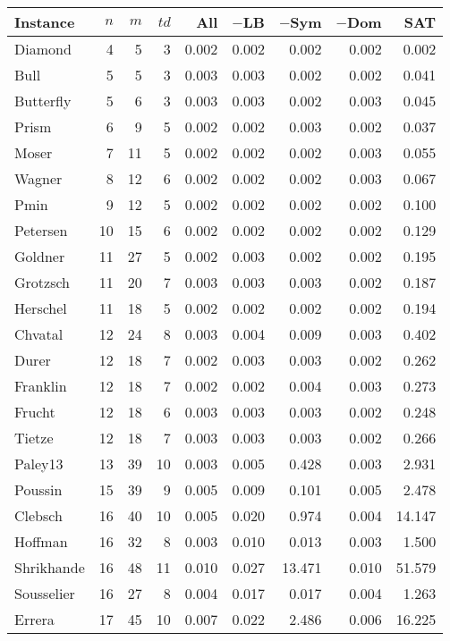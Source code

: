 \begin{table}[htb]
\centering
 \begin{tabular}{l r r r r r r r r} 
 \toprule
 Instance & $n$ & $m$ & $\mathit{td}$ & All & $-$LB & $-$Sym & $-$Dom & SAT \\ [0.5ex] 
 \midrule
Diamond & 4 & 5 & 3 & 0.002 & 0.002 & 0.002 & 0.002 & 0.002 \\
Bull & 5 & 5 & 3 & 0.003 & 0.003 & 0.002 & 0.002 & 0.041 \\
Butterfly & 5 & 6 & 3 & 0.003 & 0.003 & 0.002 & 0.003 & 0.045 \\
Prism & 6 & 9 & 5 & 0.002 & 0.002 & 0.003 & 0.002 & 0.037 \\
Moser & 7 & 11 & 5 & 0.002 & 0.002 & 0.002 & 0.003 & 0.055 \\
Wagner & 8 & 12 & 6 & 0.002 & 0.002 & 0.002 & 0.003 & 0.067 \\
Pmin & 9 & 12 & 5 & 0.002 & 0.002 & 0.002 & 0.002 & 0.100 \\
Petersen & 10 & 15 & 6 & 0.002 & 0.002 & 0.002 & 0.002 & 0.129 \\
Goldner & 11 & 27 & 5 & 0.002 & 0.003 & 0.002 & 0.002 & 0.195 \\
Grotzsch & 11 & 20 & 7 & 0.003 & 0.003 & 0.003 & 0.002 & 0.187 \\
Herschel & 11 & 18 & 5 & 0.002 & 0.002 & 0.002 & 0.002 & 0.194 \\
Chvatal & 12 & 24 & 8 & 0.003 & 0.004 & 0.009 & 0.003 & 0.402 \\
Durer & 12 & 18 & 7 & 0.002 & 0.003 & 0.003 & 0.002 & 0.262 \\
Franklin & 12 & 18 & 7 & 0.002 & 0.002 & 0.004 & 0.003 & 0.273 \\
Frucht & 12 & 18 & 6 & 0.003 & 0.003 & 0.003 & 0.002 & 0.248 \\
Tietze & 12 & 18 & 7 & 0.003 & 0.003 & 0.003 & 0.002 & 0.266 \\
Paley13 & 13 & 39 & 10 & 0.003 & 0.005 & 0.428 & 0.003 & 2.931 \\
Poussin & 15 & 39 & 9 & 0.005 & 0.009 & 0.101 & 0.005 & 2.478 \\
Clebsch & 16 & 40 & 10 & 0.005 & 0.020 & 0.974 & 0.004 & 14.147 \\
Hoffman & 16 & 32 & 8 & 0.003 & 0.010 & 0.013 & 0.003 & 1.500 \\
Shrikhande & 16 & 48 & 11 & 0.010 & 0.027 & 13.471 & 0.010 & 51.579 \\
Sousselier & 16 & 27 & 8 & 0.004 & 0.017 & 0.017 & 0.004 & 1.263 \\
Errera & 17 & 45 & 10 & 0.007 & 0.022 & 2.486 & 0.006 & 16.225 \\

\end{tabular}
\end{table}
